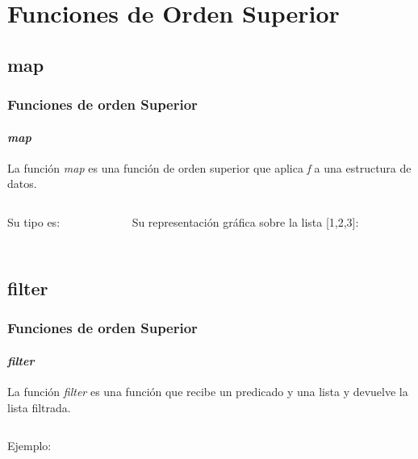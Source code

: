 \section{Funciones de Orden Superior}
\subsection{map}
\begin{frame}
  \frametitle{Funciones de orden Superior}
  \framesubtitle{\textit{map}}
  La función \textit{map} es una función de orden superior
  que aplica \textit{f} a una estructura de datos.
  \begin{columns}
    \begin{column}{0.5\textwidth}
      Su tipo es:
      \inputminted[bgcolor=bg]{haskell}{code/map.hs}
    \end{column}
    \begin{column}{0.5\textwidth}  %
      Su representación gráfica sobre la lista [1,2,3]:
      \begin{center} %
      \end{center}
    \end{column}
  \end{columns}

\end{frame}

\subsection{filter}
\begin{frame}
  \frametitle{Funciones de orden Superior}
  \framesubtitle{\textit{filter}} La función \textit{filter} es una
  función que recibe un predicado y una lista y devuelve la lista
  filtrada.
  \inputminted[bgcolor=bg]{haskell}{code/filter.hs}
  Ejemplo:
  {\color{white}
    \inputminted[bgcolor=bg]{text}{code/filter.txt}
  }
\end{frame}

